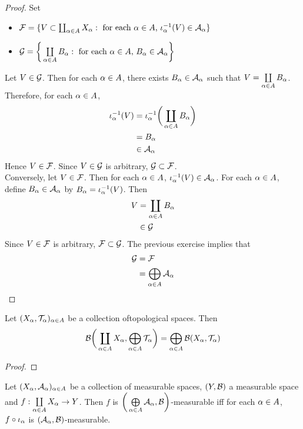 \documentclass{book}
\begin{document}
	\begin{proof}
		Set  
		\begin{itemize}
			\item $\mathcal{F}= \{V \subset \coprod_{\alpha \in A}  X_{\alpha}: \text{ for each $\alpha \in A$, $\iota_{\alpha}^{-1}(V) \in \mathcal{A}_{\alpha}$}\}$ 
			\item $\mathcal{G} = \bigg \{  \coprod\limits_{\alpha \in A}  B_{\alpha}: \text{ for each $\alpha \in A$, } B_{\alpha} \in \mathcal{A}_{\alpha} \bigg\}$
			\end{itemize}
			Let $V \in \mathcal{G}$. Then for each $\alpha \in A$, there exists $B_{\alpha} \in \mathcal{A}_{\alpha}$ such that $V =  \coprod\limits_{\alpha \in A}  B_{\alpha}$. Therefore, for each $\alpha \in A$, 
			\begin{align*}
				\iota_{\alpha}^{-1}(V)
				& = \iota_{\alpha}^{-1} \bigg( \coprod\limits_{\alpha \in A}  B_{\alpha} \bigg) \\
				& = B_{\alpha} \\
				& \in \mathcal{A}_{\alpha}
			\end{align*}
			Hence $V \in \mathcal{F}$. Since $V \in \mathcal{G}$ is arbitrary, $\mathcal{G} \subset \mathcal{F}$. \\
			Conversely, let $V \in \mathcal{F}$. Then for each $\alpha \in A$, $\iota_{\alpha}^{-1}(V) \in \mathcal{A}_{\alpha}$. For each $\alpha \in A$, define $B_{\alpha} \in \mathcal{A}_{\alpha}$ by $B_{\alpha} = \iota_{\alpha}^{-1}(V)$. Then 
			\begin{align*}
				V 
				& = \coprod\limits_{\alpha \in A} B_{\alpha} \\
				& \in \mathcal{G} 
			\end{align*}
			Since $V \in \mathcal{F}$ is arbitrary, $\mathcal{F} \subset \mathcal{G}$. The previous exercise implies that 
			\begin{align*}
				\mathcal{G}
				& = \mathcal{F} \\
				& = \bigoplus\limits_{\alpha \in A} \mathcal{A}_{\alpha}
			\end{align*}
	\end{proof}
	
	\begin{ex}
		Let $(X_{\alpha}, \mathcal{T}_{\alpha})_{\alpha \in A}$ be a collection oftopological spaces. Then 
		$$\mathcal{B} \bigg( \coprod\limits_{\alpha \in A} X_{\alpha}, \bigoplus\limits_{\alpha \in A} \mathcal{T}_{\alpha} \bigg) = \bigoplus\limits_{\alpha \in A} \mathcal{B}(X_{\alpha}, \mathcal{T}_{\alpha})$$
	\end{ex}

	\begin{proof}
	\end{proof}

	\begin{ex} 
		Let $(X_{\alpha}, \mathcal{A}_{\alpha})_{\alpha \in A}$ be a collection of measurable spaces, $(Y, \mathcal{B})$ a measurable space and $f:\coprod\limits_{\alpha \in A} X_{\alpha} \rightarrow Y$. Then $f$ is $\bigg( \bigoplus\limits_{\alpha \in A} \mathcal{A}_{\alpha}, \mathcal{B} \bigg)$-measurable iff for each $\alpha \in A$, $f \circ \iota_{\alpha}$ is $(\mathcal{A}_{\alpha}, \mathcal{B})$-measurable.
	\end{ex}
\end{document}
